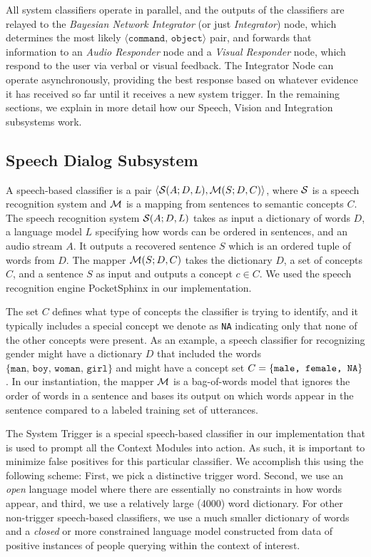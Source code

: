 \documentclass{llncs}
\begin{document}
All system classifiers operate in parallel, and the outputs of the classifiers are relayed to the {\em Bayesian Network Integrator} (or just {\em Integrator}) node, which determines the most likely $\langle \texttt{command, object}\rangle$ pair, and forwards that information to an {\em Audio Responder} node and a {\em Visual Responder} node, which respond to the user via verbal or visual feedback.  The Integrator Node can operate asynchronously, providing the best response based on whatever evidence it has received so far until it receives a new system trigger. In the remaining sections, we explain in more detail how our Speech, Vision and Integration subsystems work.

\subsection{Speech Dialog Subsystem}
A speech-based classifier is a pair
$\langle{\cal{S}}(A;D,L),{\cal{M}}(S;D,C)\rangle$, where $\cal{S}$ is a
speech recognition system and $\cal{M}$ is a mapping from sentences to
semantic concepts $C$.  The speech recognition system ${\cal{S}}(A;D,L)$
takes as input a dictionary of words $D$, a language model $L$
specifying how words can be ordered in sentences, and an audio stream
$A$. It outputs a recovered sentence $S$ which is an ordered tuple of
words from $D$. The mapper ${\cal{M}}(S;D,C)$ takes the dictionary $D$, a
set of concepts $C$, and a sentence $S$ as input and outputs a concept
$c\in C$.  We used the speech recognition engine
PocketSphinx \citep{pocketsphinx} in our implementation.

The set $C$ defines what type of concepts the classifier is trying to
identify, and it typically includes a special concept we denote as
\texttt{NA} indicating only that none of the other concepts were
present. As an example, a speech classifier for recognizing gender
might have a dictionary $D$ that included the words $\{\texttt{man,
  boy, woman, girl}\}$ and might have a concept set $C=\{\texttt{male,
  female,\mbox{ NA}}\}$. In our instantiation, the mapper $\cal{M}$
is a bag-of-words model that ignores the order of words in a sentence
and bases its output on which words appear in the sentence compared to
a labeled training set of utterances. 

The System Trigger is a special speech-based classifier in our
implementation that is used to prompt all the Context Modules into
action. As such, it is important to minimize false positives for this
particular classifier.  We accomplish this using the following scheme:
First, we pick a distinctive trigger word. Second, we use an {\em
  open} language model where there are essentially no constraints in
how words appear, and third, we use a relatively large (4000) word
dictionary. For other non-trigger speech-based classifiers, we use a
much smaller dictionary of words and a {\em closed} or more
constrained language model constructed from data of positive instances
of people querying within the context of interest.
\end{document}
